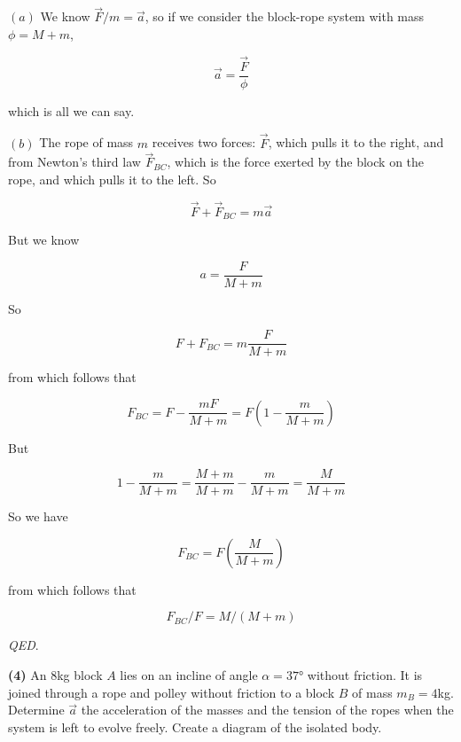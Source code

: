 \documentclass[12pt]{article}
\theoremstyle{definition}
\begin{document}
$(a)$ We know $\vec{F}/m = \vec{a}$, so if we consider the block-rope system 
with mass $\phi = M + m$, 


\begin{equation}
  \vec{a} = \frac{\vec{F}}{\phi} 
\end{equation}

which is all we can say.

$(b)$ The rope of mass $m$ receives two forces: $\vec{F}$, which pulls it to the
right, and from Newton's third law $\vec{F}_{BC}$, which is the force exerted by 
the block on the rope, and which pulls it to the left. So 

\begin{equation}
    \vec{F} + \vec{F}_{BC} = m \vec{a}
\end{equation}

But we know

\begin{equation}
    a = \frac{F}{M + m}
\end{equation}

So 

\begin{equation}
    F + F_{BC} = m \frac{F}{M + m}
\end{equation}

from which follows that 

\begin{equation}
    F_{BC} = F - \frac{mF}{M + m}  = F\left(1 - \frac{m}{M + m} \right)
\end{equation}

But 

\begin{equation}
    1 - \frac{m}{M + m}  = \frac{M+m}{M + m} - \frac{m}{M + m}  = \frac{M}{M + m}
\end{equation}

So we have 

\begin{equation}
    F_{BC} = F\left( \frac{M}{M+m} \right) 
\end{equation}

from which follows that 

\begin{equation}
    F_{BC}/F = M / (M+m)
\end{equation}

\textit{QED}.


\pagebreak 

\begin{shaded}
    \textbf{(4)} An 8kg block $A$ lies on an incline of angle $\alpha =
    \ang{37}$ without friction. It is joined through a rope and polley without
    friction to a block $B$ of mass $m_B = 4$kg. Determine $\vec{a}$ the
    acceleration of the masses and the tension of the ropes when the system is
    left to evolve freely. Create a diagram of the isolated body.
\end{shaded}
\end{document}
